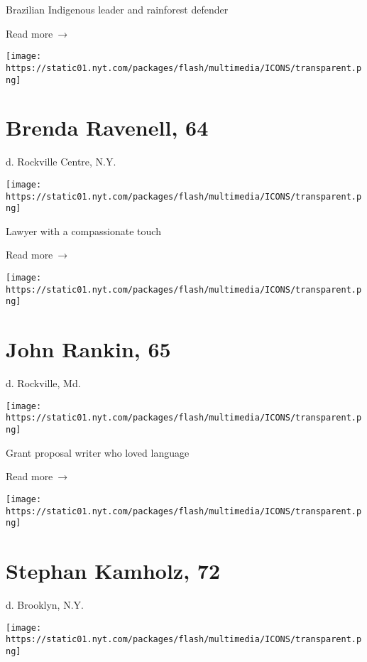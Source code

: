Brazilian Indigenous leader and rainforest defender

 Read more~→

\href{https://www.nytimes.com/2020/06/23/nyregion/brenda-ravenell-dead-coronavirus.html}{}

\texttt{[image: https://static01.nyt.com/packages/flash/multimedia/ICONS/transparent.png]}

\hypertarget{brenda-ravenell-64}{%
\section{Brenda Ravenell, 64}\label{brenda-ravenell-64}}

d. Rockville Centre, N.Y.

\texttt{[image: https://static01.nyt.com/packages/flash/multimedia/ICONS/transparent.png]}

Lawyer with a compassionate touch

 Read more~→

\href{https://www.nytimes.com/2020/06/22/obituaries/22john-rankin-dead.html}{}

\texttt{[image: https://static01.nyt.com/packages/flash/multimedia/ICONS/transparent.png]}

\hypertarget{john-rankin-65}{%
\section{John Rankin, 65}\label{john-rankin-65}}

d. Rockville, Md.

\texttt{[image: https://static01.nyt.com/packages/flash/multimedia/ICONS/transparent.png]}

Grant proposal writer who loved language

 Read more~→

\href{https://www.nytimes.com/2020/06/22/nyregion/stephan-kamholz-dead-coronavirus.html}{}

\texttt{[image: https://static01.nyt.com/packages/flash/multimedia/ICONS/transparent.png]}

\hypertarget{stephan-kamholz-72}{%
\section{Stephan Kamholz, 72}\label{stephan-kamholz-72}}

d. Brooklyn, N.Y.

\texttt{[image: https://static01.nyt.com/packages/flash/multimedia/ICONS/transparent.png]}

